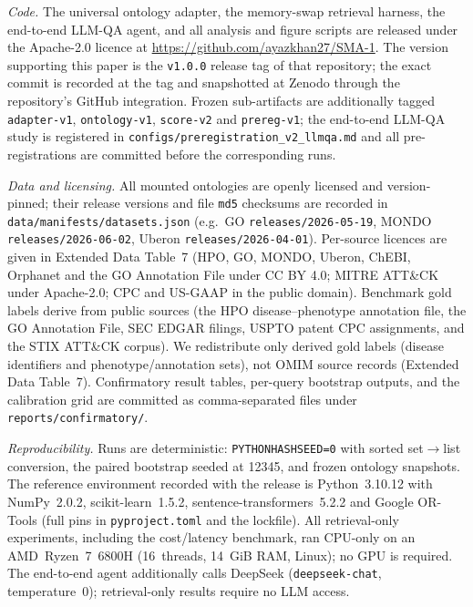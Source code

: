 \documentclass[pdflatex,sn-nature]{sn-jnl}
\begin{document}
\backmatter

\textit{Code.} The universal ontology adapter, the memory-swap retrieval harness,
the end-to-end LLM-QA agent, and all analysis and figure scripts are released
under the Apache-2.0 licence at
\url{https://github.com/ayazkhan27/SMA-1}. The version supporting this paper is the
\texttt{v1.0.0} release tag of that repository; the exact commit is recorded at the
tag and snapshotted at Zenodo through the repository's GitHub integration. Frozen
sub-artifacts are additionally tagged \texttt{adapter-v1},
\texttt{ontology-v1}, \texttt{score-v2} and \texttt{prereg-v1}; the end-to-end
LLM-QA study is registered in \texttt{configs/preregistration\_v2\_llmqa.md} and
all pre-registrations are committed before the corresponding runs.

\textit{Data and licensing.} All mounted ontologies are openly licensed and
version-pinned; their release versions and file \texttt{md5} checksums are
recorded in \texttt{data/manifests/datasets.json} (e.g.\ GO
\texttt{releases/2026-05-19}, MONDO \texttt{releases/2026-06-02}, Uberon
\texttt{releases/2026-04-01}). Per-source licences are given in Extended Data
Table~7 (HPO, GO, MONDO, Uberon, ChEBI, Orphanet and the GO Annotation File under
CC BY 4.0; MITRE ATT\&CK under Apache-2.0; CPC and US-GAAP in the public domain).
Benchmark gold labels derive from public sources (the HPO disease--phenotype
annotation file, the GO Annotation File, SEC EDGAR filings, USPTO patent CPC
assignments, and the STIX ATT\&CK corpus). We redistribute only derived gold
labels (disease identifiers and phenotype/annotation sets), not OMIM source
records (Extended Data Table~7). Confirmatory result tables, per-query bootstrap
outputs, and the calibration grid are committed as comma-separated files under
\texttt{reports/confirmatory/}.

\textit{Reproducibility.} Runs are deterministic: \texttt{PYTHONHASHSEED=0} with
sorted set$\to$list conversion, the paired bootstrap seeded at 12345, and frozen
ontology snapshots. The reference environment recorded with the release is
Python~3.10.12 with NumPy~2.0.2, scikit-learn~1.5.2, sentence-transformers~5.2.2
and Google OR-Tools (full pins in \texttt{pyproject.toml} and the lockfile). All
retrieval-only experiments, including the cost/latency benchmark, ran CPU-only on
an AMD~Ryzen~7~6800H (16~threads, 14~GiB RAM, Linux); no GPU is required. The
end-to-end agent additionally calls DeepSeek (\texttt{deepseek-chat},
temperature~0); retrieval-only results require no LLM access.
\end{document}
